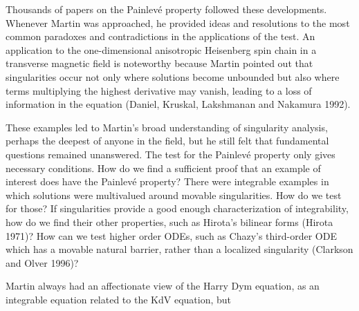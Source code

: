 \documentclass[11pt]{article}
\begin{document}
\par\smallskip%
Thousands of papers on the Painlev\'e property followed these developments. Whenever Martin was approached, he provided ideas 
and resolutions to the most common paradoxes and contradictions in the applications of the test. An application to the one-dimensional anisotropic Heisenberg spin chain in a transverse magnetic field is noteworthy because Martin pointed out that singularities occur not only where solutions become unbounded but also where terms multiplying the highest derivative may vanish, leading to a loss of information in the equation (Daniel, Kruskal, Lakshmanan and Nakamura 1992).  
\par\smallskip%
These examples led to Martin's broad understanding of singularity analysis, perhaps the deepest of anyone in the field, 
but he still felt that fundamental questions remained unanswered. The test for the Painlev\'e property only gives necessary conditions. How do we find a sufficient proof that an example of interest does have the Painlev\'e property? There were integrable examples in which solutions were multivalued around movable singularities. How do we test for those? If singularities provide a good enough characterization of integrability, how do we find their other properties, such as Hirota's bilinear forms 
(Hirota 1971)? How can we test higher order ODEs, such as Chazy's third-order ODE which has a movable natural barrier, rather than a localized singularity (Clarkson and Olver 1996)? 
\par\smallskip%
Martin always had an affectionate view of the Harry Dym equation, as an integrable equation related to the KdV equation, but 
\end{document}
